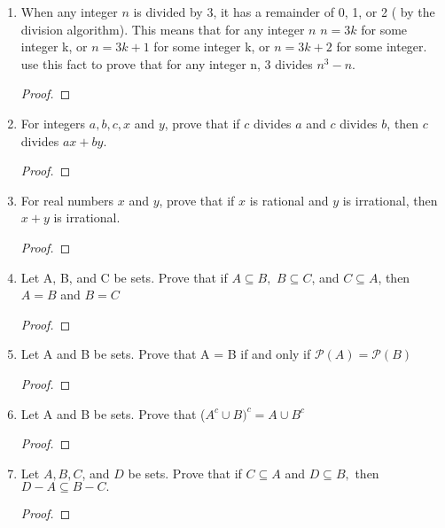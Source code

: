 \documentclass[11pt]{article}
\begin{document}
\begin{enumerate}
    \item When any integer $n$ is divided by 3, it has a remainder of 0, 1, or 2 ( by the division algorithm). This means that for any integer $n$ 
            \newline \newline
             $n = 3k$ for some integer k, or
            \newline
            $n = 3k+1$ for some integer k, or 
            \newline
            $n = 3k+2$ for some integer.
    use this fact to prove that for any integer n, 3 divides $n^3 - n$.
        \begin{proof}
        \end{proof}
        
    \item For integers $a,b,c,x$ and $y$, prove that if $c$ divides $a$ and $c$ divides $b$, then $c$ divides $ax+by$.
        \begin{proof}
        \end{proof}
        
    \item For real numbers $x$ and $y$, prove that if $x$ is rational and $y$ is irrational, then $x + y$ is irrational. 
        \begin{proof}
        \end{proof}
        
    \item Let A, B, and C be sets. Prove that if $A \subseteq B,$ $B \subseteq C$, and $C \subseteq A$, then $A = B$ and $B = C$
        \begin{proof}
        \end{proof}
        
    \item Let A and B be sets. Prove that A = B if and only if $\mathscr{P}(A) = \mathscr{P}(B)$
        \begin{proof}
        \end{proof}
        
    \item Let A and B be sets. Prove that ($A^c \cup B)^c = A \cup B^c$
        \begin{proof}
        \end{proof}
        
    \item Let $A,B,C$, and $D$ be sets. Prove that if $C \subseteq A$ and $D \subseteq B,$ then $D-A\subseteq B-C.$
        \begin{proof}
        \end{proof}
        

\end{enumerate}
\end{document}
